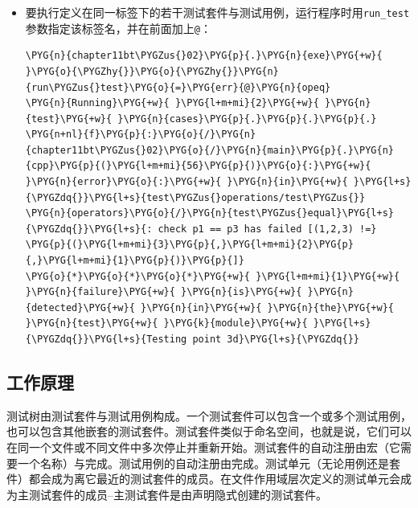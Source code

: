 \begin{itemize}
\item 要执行定义在同一标签下的若干测试套件与测试用例，运行程序时用\texttt{run\_\allowbreak{}test}参数指定该标签名，并在前面加上\texttt{@}：



\begin{codeblockbg}
\begin{Verbatim}[commandchars=\\\{\},breaklines=true,breakanywhere=true,fontsize=\codefont,xleftmargin=17bp]
\PYG{n}{chapter11bt\PYGZus{}02}\PYG{p}{.}\PYG{n}{exe}\PYG{+w}{ }\PYG{o}{\PYGZhy{}}\PYG{o}{\PYGZhy{}}\PYG{n}{run\PYGZus{}test}\PYG{o}{=}\PYG{err}{@}\PYG{n}{opeq}
\PYG{n}{Running}\PYG{+w}{ }\PYG{l+m+mi}{2}\PYG{+w}{ }\PYG{n}{test}\PYG{+w}{ }\PYG{n}{cases}\PYG{p}{.}\PYG{p}{.}\PYG{p}{.}
\PYG{n+nl}{f}\PYG{p}{:}\PYG{o}{/}\PYG{n}{chapter11bt\PYGZus{}02}\PYG{o}{/}\PYG{n}{main}\PYG{p}{.}\PYG{n}{cpp}\PYG{p}{(}\PYG{l+m+mi}{56}\PYG{p}{)}\PYG{o}{:}\PYG{+w}{ }\PYG{n}{error}\PYG{o}{:}\PYG{+w}{ }\PYG{n}{in}\PYG{+w}{ }\PYG{l+s}{\PYGZdq{}}\PYG{l+s}{test\PYGZus{}operations/test\PYGZus{}}
\PYG{n}{operators}\PYG{o}{/}\PYG{n}{test\PYGZus{}equal}\PYG{l+s}{\PYGZdq{}}\PYG{l+s}{: check p1 == p3 has failed [(1,2,3) !=}
\PYG{p}{(}\PYG{l+m+mi}{3}\PYG{p}{,}\PYG{l+m+mi}{2}\PYG{p}{,}\PYG{l+m+mi}{1}\PYG{p}{)}\PYG{p}{]}
\PYG{o}{*}\PYG{o}{*}\PYG{o}{*}\PYG{+w}{ }\PYG{l+m+mi}{1}\PYG{+w}{ }\PYG{n}{failure}\PYG{+w}{ }\PYG{n}{is}\PYG{+w}{ }\PYG{n}{detected}\PYG{+w}{ }\PYG{n}{in}\PYG{+w}{ }\PYG{n}{the}\PYG{+w}{ }\PYG{n}{test}\PYG{+w}{ }\PYG{k}{module}\PYG{+w}{ }\PYG{l+s}{\PYGZdq{}}\PYG{l+s}{Testing point 3d}\PYG{l+s}{\PYGZdq{}}
\end{Verbatim}
\end{codeblockbg}

\end{itemize}



\subsection{工作原理}



测试树由测试套件与测试用例构成。一个测试套件可以包含一个或多个测试用例，也可以包含其他嵌套的测试套件。测试套件类似于命名空间，也就是说，它们可以在同一个文件或不同文件中多次停止并重新开始。测试套件的自动注册由宏（它需要一个名称）与完成。测试用例的自动注册由完成。测试单元（无论用例还是套件）都会成为离它最近的测试套件的成员。在文件作用域层次定义的测试单元会成为主测试套件的成员--主测试套件是由声明隐式创建的测试套件。


